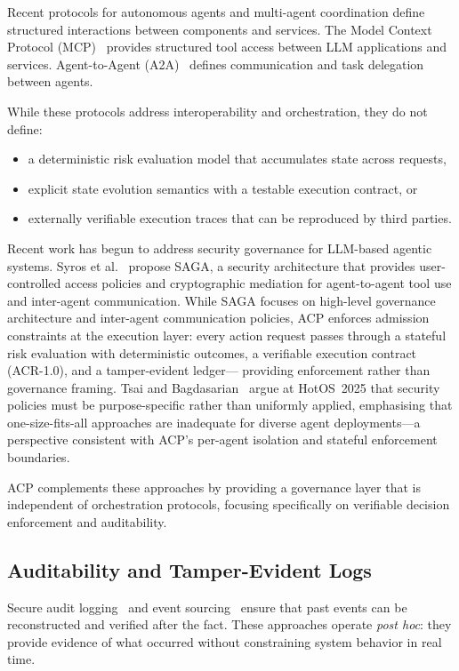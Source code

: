 \documentclass[11pt]{article}
\theoremstyle{definition}
\begin{document}
Recent protocols for autonomous agents and multi-agent coordination define structured interactions
between components and services.
The Model Context Protocol (MCP)~\cite{mcp} provides structured tool access between LLM applications and services.
Agent-to-Agent (A2A)~\cite{a2a} defines communication and task delegation between agents.

While these protocols address interoperability and orchestration, they do not define:
\begin{itemize}[noitemsep]
  \item a deterministic risk evaluation model that accumulates state across requests,
  \item explicit state evolution semantics with a testable execution contract, or
  \item externally verifiable execution traces that can be reproduced by third parties.
\end{itemize}

Recent work has begun to address security governance for LLM-based agentic systems.
Syros et al.~\cite{syros2025saga} propose SAGA, a security architecture that provides
user-controlled access policies and cryptographic mediation for agent-to-agent tool use
and inter-agent communication.
While SAGA focuses on high-level governance architecture and inter-agent
communication policies, ACP enforces admission constraints at the execution layer:
every action request passes through a stateful risk evaluation with deterministic
outcomes, a verifiable execution contract (ACR-1.0), and a tamper-evident ledger---
providing enforcement rather than governance framing.
Tsai and Bagdasarian~\cite{tsai2025contextual} argue at HotOS~2025 that security policies
must be purpose-specific rather than uniformly applied, emphasising that one-size-fits-all
approaches are inadequate for diverse agent deployments---a perspective consistent with
ACP's per-agent isolation and stateful enforcement boundaries.

ACP complements these approaches by providing a governance layer that is independent of
orchestration protocols, focusing specifically on verifiable decision enforcement and auditability.

\subsection{Auditability and Tamper-Evident Logs}

Secure audit logging~\cite{schneier1999secure} and event sourcing~\cite{fowler2005event} ensure
that past events can be reconstructed and verified after the fact.
These approaches operate \emph{post hoc}: they provide evidence of what occurred without
constraining system behavior in real time.
\end{document}
